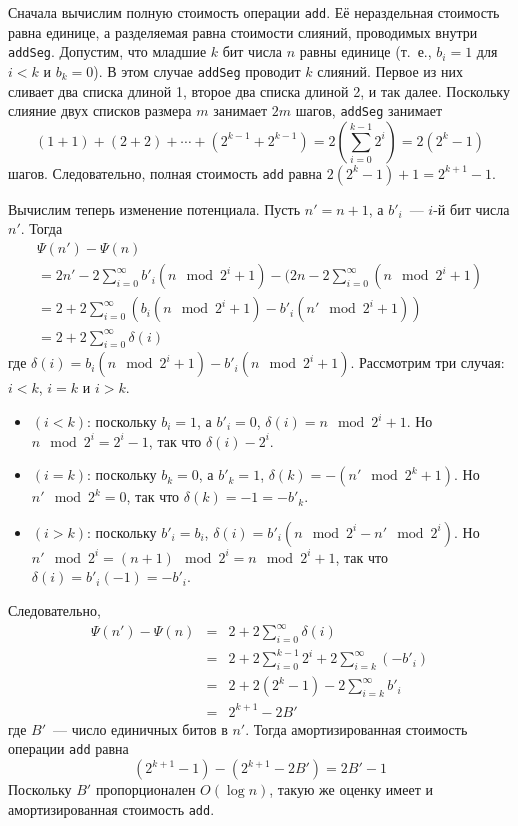 Сначала вычислим полную стоимость операции \lstinline!add!. Её
нераздельная стоимость равна единице, а разделяемая равна
стоимости слияний, проводимых внутри \lstinline!addSeg!. Допустим, что
младшие $k$ бит числа $n$ равны единице (т.~е., $b_i =1$ для $i < k$ и
$b_k = 0$). В этом случае \lstinline!addSeg! проводит $k$ слияний.
Первое из них сливает два списка длиной 1, второе два списка длиной 2,
и так далее. Поскольку слияние двух списков размера $m$ занимает $2m$
шагов, \lstinline!addSeg! занимает
$$
(1+1) + (2+2) + \cdots + (2^{k-1} + 2^{k-1}) = 2(\sum_{i=0}^{k-1} 2^i)
= 2 (2^k - 1)
$$
шагов. Следовательно, полная стоимость \lstinline!add! равна $2(2^k -
1) + 1 = 2^{k+1} - 1$.

Вычислим теперь изменение потенциала. Пусть $n' = n+1$, а $b'_i$~---
$i$-й бит числа $n'$. Тогда
$$
\begin{array}{l}
\Psi(n') - \Psi(n) \\
= 2n' - 2\sum_{i=0}^\infty b'_i (n \mod 2^i + 1) - (2n - 2\sum_{i=0}^\infty (n \mod 2^i + 1) \\
= 2 + 2\sum_{i=0}^\infty (b_i(n \mod 2^i + 1) - b'_i(n' \mod 2^i + 1)) \\
= 2 + 2\sum_{i=0}^\infty \delta(i)
\end{array}
$$
где $\delta(i) = b_i(n \mod 2^i + 1) - b'_i(n \mod 2^i +
1)$. Рассмотрим три случая: $i < k$, $i = k$ и $i > k$.
\begin{itemize}
\item $(i < k)$: поскольку $b_i = 1$, а $b'_i = 0$, $\delta(i) = n
  \mod 2^i + 1$. Но $n \mod 2^i = 2^i - 1$, так что $\delta(i) - 2^i$.
\item $(i = k)$: поскольку $b_k = 0$, а $b'_k = 1$, $\delta(k) = -(n'
  \mod 2^k + 1)$. Но $n' \mod 2^k = 0$, так что $\delta(k) = -1 = -b'_k$.
\item $(i > k)$: поскольку $b'_i = b_i$, $\delta(i) = b'_i (n \mod 2^i
  - n' \mod 2^i)$. Но $n' \mod 2^i = (n+1) \mod 2^i = n \mod 2^i + 1$,
  так что $\delta(i) = b'_i(-1) = -b'_i$. 
\end{itemize}
Следовательно,
$$
\begin{array}{lcl}
\Psi(n') - \Psi(n) & = & 2 + 2\sum_{i=0}^\infty \delta(i) \\
& = & 2 + 2\sum_{i=0}^{k-1} 2^i + 2 \sum_{i=k}^\infty (-b'_i) \\
& = & 2 + 2(2^k - 1) - 2\sum_{i=k}^\infty b'_i \\
& = & 2^{k+1} - 2B'
\end{array}
$$
где $B'$~--- число единичных битов в $n'$. Тогда амортизированная
стоимость операции \lstinline!add! равна
$$
(2^{k+1} - 1) - (2^{k+1} - 2B') = 2B' -1
$$
Поскольку $B'$ пропорционален $O(\log n)$, такую же оценку имеет и
амортизированная стоимость \lstinline!add!.

